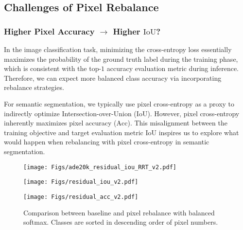 \documentclass[final]{cvpr}
\begin{document}
\subsection{Challenges of Pixel Rebalance}
\label{sec:challenges_rebalance}

\subsubsection{Higher Pixel Accuracy $\to$ Higher $\mathrm{IoU}$?} 
\label{sec:challenge1}
In the image classification task, minimizing the cross-entropy loss essentially maximizes the probability of the ground truth label during the training phase, which is consistent with the top-$1$ accuracy evaluation metric during inference.
Therefore, we can expect more balanced class accuracy via incorporating rebalance strategies.


For semantic segmentation, we typically use pixel cross-entropy as a proxy to indirectly optimize Intersection-over-Union ($\mathrm{IoU}$). However, pixel cross-entropy inherently maximizes pixel accuracy ($\mathrm{Acc}$). This misalignment between the training objective and target evaluation metric $\mathrm{IoU}$ inspires us to explore what would happen when rebalancing with pixel cross-entropy in semantic segmentation.


\begin{figure*} 
	\begin{center}
	    \begin{minipage}[t]{0.32\textwidth} 
			\begin{center}
				\texttt{[image: Figs/ade20k\_residual\_iou\_RRT\_v2.pdf]} 
			\end{center} 
		\end{minipage} 
		\hspace{0.05in}
		\begin{minipage}[t]{0.32\textwidth} 
			\begin{center}
				\texttt{[image: Figs/residual\_iou\_v2.pdf]} 
			\end{center} 
		\end{minipage} 
		\hspace{0.05in}
		\begin{minipage}[t]{0.32\textwidth} 
			\begin{center}
				\texttt{[image: Figs/residual\_acc\_v2.pdf]} 
			\end{center}
		\end{minipage}
	\end{center}
	\vspace{-0.20in}
	\caption{Comparison between baseline and pixel rebalance with balanced softmax. Classes are sorted in descending order of pixel numbers.}
	\label{fig:baseline_vs_pixrebalance}
\end{figure*}
\end{document}
